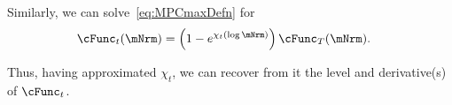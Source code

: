 \documentclass[\econtexRoot/BufferStockTheory]{subfiles}
\begin{document}
\begin{comment} %
\begin{equation}\begin{gathered}\begin{aligned}
 \lim_{\mu \downarrow -\infty} \chi^{\prime}(\mu)  & = \left(\frac{-\left(\frac{\cFunc^{\prime}_{t}\cFunc_{T}^{\prime}\mNrm-\cFunc_{t}^{\prime}\mNrm\cFunc_{T}^{\prime}}{(\cFunc_{T}^{\prime}\mNrm)^{2}}\mNrm\right)}{(\cFunc_{T}^{\prime}\mNrm-\cFunc_{t}^{\prime}\mNrm)/\cFunc_{T}^{\prime}\mNrm}\right)
\\  & = \left(\frac{-\left(\frac{\cFunc^{\prime}_{t}\cFunc_{T}^{\prime}-\cFunc_{t}^{\prime}\cFunc_{T}^{\prime}}{(\cFunc_{T}^{\prime})^{2}}\right)}{(\cFunc_{T}^{\prime}-\cFunc_{t}^{\prime})/\cFunc_{T}^{\prime}}\right)
\\  & = \left(\frac{-\left(\cFunc^{\prime}_{t}\cFunc_{T}^{\prime}-\cFunc_{t}^{\prime}\cFunc_{T}^{\prime}\right)}{(\cFunc_{T}^{\prime}-\cFunc_{t}^{\prime})\cFunc_{T}^{\prime}}\right)
\end{aligned}\end{gathered}\end{equation}
\end{comment}

Similarly, we can solve~\eqref{eq:MPCmaxDefn} for
\begin{equation}\begin{gathered}\begin{aligned}
    \cFunc_{t}(\mNrm)  & = \left(1-e^{\chi_{t}(\log \mNrm)}\right)\cFunc_{T}(\mNrm) \label{eq:cFuncFromChi}.
\end{aligned}\end{gathered}\end{equation}

Thus, having approximated $\chi_{t}$, we can recover from it the level and derivative(s) of $\cFunc_{t}$.%
\end{document}
